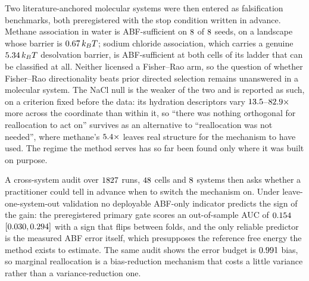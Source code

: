 Two literature-anchored molecular systems were then entered as falsification benchmarks, both
preregistered with the stop condition written in advance. Methane association in water is
ABF-sufficient on $8$ of $8$ seeds, on a landscape whose barrier is
$0.67\,k_BT$; sodium chloride association, which carries a genuine
$5.34\,k_BT$ desolvation barrier, is ABF-sufficient at both cells of its ladder that can
be classified at all. Neither licensed a Fisher--Rao arm, so the question of whether Fisher--Rao
directionality beats prior directed selection remains unanswered in a molecular system. The NaCl
null is the weaker of the two and is reported as such, on a criterion fixed before the data:
its hydration descriptors vary $13.5$--$82.9\times$ more across the coordinate than
within it, so ``there was nothing orthogonal for reallocation to act on'' survives as an
alternative to ``reallocation was not needed'', where methane's $5.4\times$ leaves
real structure for the mechanism to have used. The regime the method serves has so far been
found only where it was built on purpose.

A cross-system audit over $1827$ runs, $48$ cells and $8$ systems then asks
whether a practitioner could tell in advance when to switch the mechanism on. Under
leave-one-system-out validation no deployable ABF-only indicator predicts the sign of the gain:
the preregistered primary gate scores an out-of-sample AUC of $0.154$
$[0.030, 0.294]$ with a sign that flips between folds, and the only reliable
predictor is the measured ABF error itself, which presupposes the reference free energy the
method exists to estimate. The same audit shows the error budget is $0.991$ bias, so
marginal reallocation is a bias-reduction mechanism that costs a little variance rather than a
variance-reduction one.

